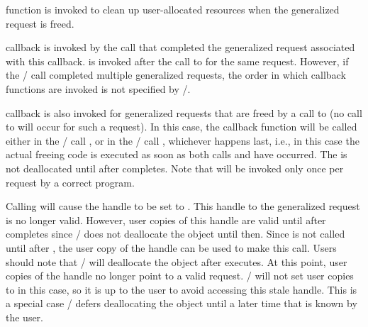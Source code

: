  function is invoked to clean up user-allocated
resources when the generalized request is freed. 

 callback is invoked by the 
%
%
%
%
%
%
 call that
completed the generalized request associated with this
callback.  is invoked after the call to
 for the same request.  However, if the \MPI/ call
completed multiple generalized requests, the order in which
 callback functions are invoked is not specified by
\MPI/.
 
 callback 
is also invoked for generalized requests that are freed by a call to
 (no call to 
%
%
%
%
%
%
 will occur for
such a request).  In this case, the callback
function will be called either in the \MPI/ call
, or in the \MPI/ call
, whichever happens 
last, i.e., 
in this case the actual freeing code is executed
as soon as both calls  and
 have occurred. 
The  is not deallocated until after
 completes.
Note that  will be 
invoked only once per request by a correct program. 

\begin{users}
Calling  will cause the
 handle to be set to .
This handle to the generalized request is no longer valid.  However,
user copies of this handle are valid until after
 completes since \MPI/ does not deallocate the object
until then.  Since  is not
called until after , the user copy of
the handle can be used to make this call.  Users should note that
\MPI/ will deallocate the object after 
executes.  At this point, user copies of the  handle no
longer point to a valid request.  \MPI/ will not set user copies to
 in this case, so it is up to the user to
avoid accessing this stale handle.  This is a special case  \mpi/
defers deallocating the object until a later time that is known by
the user.
\end{users}

